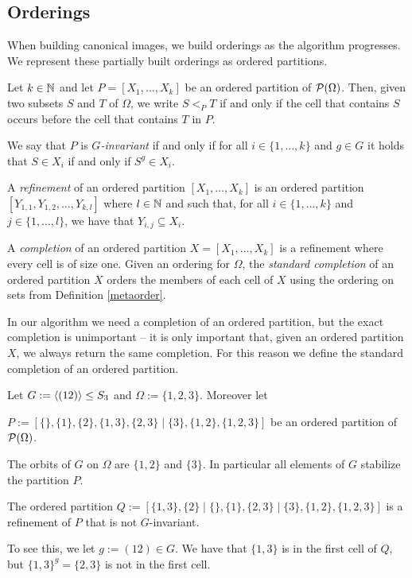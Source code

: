 
\subsection{Orderings}

When building canonical images, we build orderings as the algorithm progresses.
We represent these partially built orderings as ordered partitions.

\begin{defi}
  Let $k \in \mathbb{N}$ and let \(P=[X_1,\dots,X_k]\) be an ordered partition of
  $\mathcal{P}(\Omega)$. Then, given two
  subsets $S$ and $T$ of $\Omega$, we write \(S <_P T\) if and only if the cell
  that contains \(S\) occurs before the cell that contains \(T\) in \(P\).

  We say that $P$ is \emph{\(G\)-invariant} if and only if for all
  \(i \in \{1,\dots,k\}\) and \(g \in G\) it holds that \(S \in X_i\)
  if and only if \(S^g \in X_i\).

  A \emph{refinement} of an ordered partition $[X_1,\dots,X_k]$ is an ordered
  partition $[Y_{1,1},Y_{1,2},\dots,Y_{k,l}]$ where $l \in \mathbb{N}$ and such that,
  for all $i \in \{1,\dots,k\}$ and $j \in \{1,\dots,l\}$, we have that
  $Y_{i,j} \subseteq X_i$.

  A \emph{completion} of an ordered partition $X = [X_1,\dots,X_k]$ is a
  refinement where every cell is of size one. Given an ordering for
  \(\Omega\), the \emph{standard completion} of an ordered partition \(X\)
  orders the members of each cell of \(X\) using the ordering on sets from
  Definition \ref{metaorder}.
\end{defi}

In our algorithm we need a completion of an ordered partition, but the exact
completion is unimportant -- it is only important that, given an ordered
partition \(X\), we always return the same completion.
For this reason we define the standard completion of an ordered partition.

\begin{ex}\label{ex:orderpart}
Let $G:=\langle (12)\rangle \le S_{3}$ and $\Omega :=\{1,2,3\}$. Moreover let

$P:=[ \{\}, \{1\}, \{2\}, \{1,3\}, \{2,3\} \mid \{3\}, \{1,2\}, \{1,2,3\} ]$
be an ordered partition of $\mathcal{P}(\Omega)$.

The orbits of $G$ on $\Omega$ are $\{1,2\}$ and $\{3\}$.
In particular all elements of $G$ stabilize the partition
$P$.

The ordered partition $Q:=[\{1,3\}, \{2\} \mid \{\}, \{1\}, \{2,3\} \mid \{3\}, \{1,2\}, \{1,2,3\} ]$ is a refinement
of $P$ that is not $G$-invariant.

To see this, we let $g:=(12) \in G$. We have that $\{1,3\}$ is in the first cell
of \(Q\), but $\{1,3\}^g = \{2,3\}$ is not in the first cell.
\end{ex}


